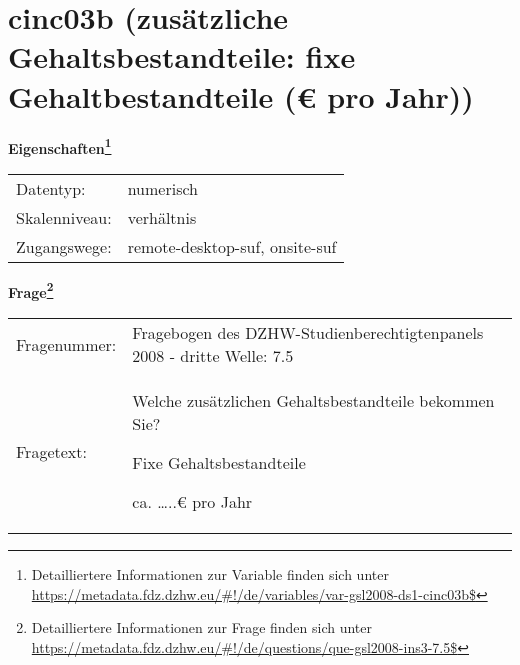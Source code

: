 
    \setcounter{footnote}{0}

    \vspace*{-1.8cm}
	\section{cinc03b (zusätzliche Gehaltsbestandteile: fixe Gehaltbestandteile (€ pro Jahr))}
	\label{section:cinc03b}



    \vspace*{0.5cm}
    \noindent\textbf{Eigenschaften\footnote{Detailliertere Informationen zur Variable finden sich unter
		\url{https://metadata.fdz.dzhw.eu/\#!/de/variables/var-gsl2008-ds1-cinc03b$}}}\\
	\begin{tabularx}{\hsize}{@{}lX}
	Datentyp: & numerisch \\
	Skalenniveau: & verhältnis \\
	Zugangswege: &
	  remote-desktop-suf, 
	  onsite-suf
 \\
    \end{tabularx}



				\vspace*{0.5cm}
                \noindent\textbf{Frage\footnote{Detailliertere Informationen zur Frage finden sich unter
		              \url{https://metadata.fdz.dzhw.eu/\#!/de/questions/que-gsl2008-ins3-7.5$}}}\\
				\begin{tabularx}{\hsize}{@{}lX}
					Fragenummer: &
					  Fragebogen des DZHW-Studienberechtigtenpanels 2008 - dritte Welle:
					  7.5
 \\
					Fragetext: & Welche zusätzlichen Gehaltsbestandteile bekommen Sie?\par  Fixe Gehaltsbestandteile\par  ca. …..€ pro Jahr \\
				\end{tabularx}






